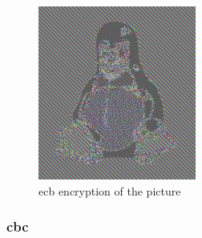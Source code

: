 \begin{minipage}{\linewidth}
      \begin{minipage}{0.4\linewidth}
          \begin{figure}[H]
              \includegraphics[width=\linewidth]{figures/TuxECB.png}
              \caption{\gls{ecb} encryption of the picture}
              \label{fig:tuxecb}
          \end{figure}
      \end{minipage}
  \end{minipage}

\subsubsection{\gls{cbc}}

